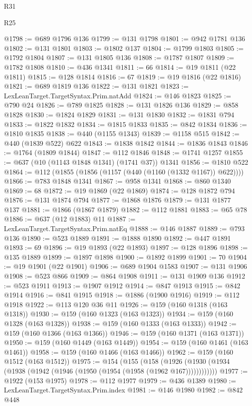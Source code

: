 \begin{lexlean}{R31}
\begin{lexlean}{R25}
\begin{coremodule}
{{{{{{{{{{{{{{{{{{{{{{{{{{{{{{{{{{{{{{{{{{{{{{{{{{{{{{{{{{{{{{{{{{{{{{{{{{{{{{{{{{{{{{{{{{{{{{{{{{{{{{{{{{{{{{{{{{{{{{{{{{{{{{{{{{{{{{{{{{{{{{{{{{{{{{{{{{{{{{{{{{{{{{{{{{{{{{{{{{{{{{{{{{{{{{{{{{{{{{{@1798 := @689 @1796 @136
@1799 := @131 @1798
@1801 := @942 @1781 @136
@1802 := @131 @1801
@1803 := @1802 @137
@1804 := @1799 @1803
@1805 := @1792 @1804
@1807 := @131 @1805 @136
@1808 := @1787 @1807
@1809 := @1782 @1808
@1810 := @436 @1341
@1811 := 66
@1814 := @19 @1811 (@22 @1811)
@1815 := @128 @1814
@1816 := 67
@1819 := @19 @1816 (@22 @1816)
@1821 := @689 @1819 @136
@1822 := @131 @1821
@1823 := LexLeanTarget.TargetSyntax.Prim.natAdd
@1824 := @146 @1823
@1825 := @790 @24
@1826 := @789 @1825
@1828 := @131 @1826 @136
@1829 := @858 @1828
@1830 := @1824 @1829
@1831 := @131 @1830
@1832 := @1831 @794
@1833 := @1822 @1832
@1834 := @1815 @1833
@1835 := @842 @1834
@1836 := @1810 @1835
@1838 := @440 (@1155 @1343)
@1839 := @1158 @515
@1842 := @440 (@1839 @522) @622
@1843 := @1838 @1842
@1844 := @1836 @1843
@1846 := @1764 (@1809 @1844)
@1847 := @112 @1846
@1848 := @1741 @1257
@1855 := @637 (@10 (@1143 @1848 @1341) (@1741 @37)) @1341
@1856 := @1810 @522
@1864 := @112 (@1855 (@1856 (@1157 (@440 (@1160 (@1332 @1167)) @622))))
@1866 := @783 @1848 @1341
@1867 := @958 @1341
@1868 := @860 @1340
@1869 := 68
@1872 := @19 @1869 (@22 @1869)
@1874 := @128 @1872 @794
@1876 := @131 @1874 @794
@1877 := @1868 @1876
@1879 := @131 @1877 @137
@1881 := @1866 (@1867 @1879)
@1882 := @112 @1881
@1883 := @65 @78
@1886 := @637 (@12 @1883) @11
@1887 := LexLeanTarget.TargetSyntax.Prim.natEq
@1888 := @146 @1887
@1889 := @793 @136
@1890 := @523 @1889
@1891 := @1888 @1890
@1892 := @447 @1891
@1893 := 69
@1896 := @19 @1893 (@22 @1893)
@1897 := @128 @1896
@1898 := @135 @1889
@1899 := @1897 @1898
@1900 := @1892 @1899
@1901 := 70
@1904 := @19 @1901 (@22 @1901)
@1906 := @689 @1904 @1583
@1907 := @131 @1906
@1908 := @523 @866
@1909 := @864 @1908
@1911 := @131 @1909 @136
@1912 := @523 @1911
@1913 := @1907 @1912
@1914 := @847 @1913
@1915 := @842 @1914
@1916 := @841 @1915
@1918 := @1886 (@1900 @1916)
@1919 := @112 @1918
@1922 := @113 @120 @36 @11
@1926 := @159 (@160 @1318 (@163 @1318))
@1930 := @159 (@160 @1323 (@163 @1323))
@1934 := @159 (@160 @1328 (@163 @1328))
@1938 := @159 (@160 @1333 (@163 @1333))
@1942 := @159 (@160 @1366 (@163 @1366))
@1946 := @159 (@160 @1371 (@163 @1371))
@1950 := @159 (@160 @1449 (@163 @1449))
@1954 := @159 (@160 @1461 (@163 @1461))
@1958 := @159 (@160 @1466 (@163 @1466))
@1962 := @159 (@160 @1512 (@163 @1512))
@1975 := @154
    (@155
      (@158 (@1926 (@1930 (@1934 (@1938 (@1942 (@1946 (@1950 (@1954 (@1958 (@1962 @167))))))))))))
@1977 := @1922 (@153 @1975)
@1978 := @112 @1977
@1979 := @436 @1389
@1980 := LexLeanTarget.TargetSyntax.Prim.index
@1981 := @146 @1980
@1982 := @842 @448
}}}}}}}}}}}}}}}}}}}}}}}}}}}}}}}}}}}}}}}}}}}}}}}}}}}}}}}}}}}}}}}}}}}}}}}}}}}}}}}}}}}}}}}}}}}}}}}}}}}}}}}}}}}}}}}}}}}}}}}}}}}}}}}}}}}}}}}}}}}}}}}}}}}}}}}}}}}}}}}}}}}}}}}}}}}}}}}}}}}}}}}}}}}}}}}}}}}}}}}
\end{coremodule}
\end{lexlean}
\end{lexlean}
